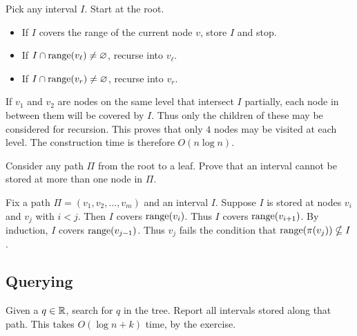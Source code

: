 Pick any interval $I$.
Start at the root.
\begin{itemize}
    \item If $I$ covers the range of the current node $v$,
        store $I$ and stop.
    \item If $I \cap \operatorname{range}(v_\ell) \ne \varnothing$, recurse into $v_\ell$.
    \item If $I \cap \operatorname{range}(v_r) \ne \varnothing$, recurse into $v_r$.
\end{itemize}
If $v_1$ and $v_2$ are nodes on the same level that intersect $I$ partially,
each node in between them will be covered by $I$.
Thus only the children of these may be considered for recursion.
This proves that only $4$ nodes may be visited at each level.
The construction time is therefore $O(n \log n)$.

\begin{exercise*}
    Consider any path $\Pi$ from the root to a leaf.
    Prove that an interval cannot be stored at more than one node in $\Pi$.
\end{exercise*}
\begin{solution}
    Fix a path $\Pi = (v_1, v_2, \dots, v_m)$ and an interval $I$.
    Suppose $I$ is stored at nodes $v_i$ and $v_j$ with $i < j$.
    Then $I$ covers $\operatorname{range}(v_i)$.
    Thus $I$ covers $\operatorname{range}(v_{i+1})$.
    By induction, $I$ covers $\operatorname{range}(v_{j-1})$.
    Thus $v_j$ fails the condition that
    $\operatorname{range}(\pi(v_j)) \nsubseteq I$.
\end{solution}

\subsection{Querying} \label{sec:segtree:querying}
Given a $q \in \mathbb{R}$, search for $q$ in the tree.
Report all intervals stored along that path.
This takes $O(\log n + k)$ time, by the exercise.

